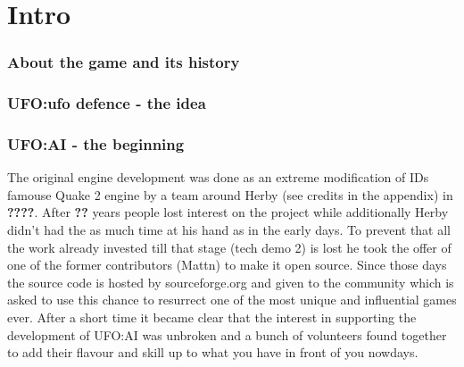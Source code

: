 
%
%


\section{Intro}

\subsubsection{About the game and its history}

\subsubsection{UFO:ufo defence - the idea}

\subsubsection{UFO:AI - the beginning}
The original engine development was done as an extreme modification of IDs famouse Quake 2 engine by a team around Herby (see credits in the appendix) in \textbf{????}. After \textbf{??} years people lost interest on the project while additionally Herby didn't had the as much time at his hand as in the early days.
To prevent that all the work already invested till that stage (tech demo 2) is lost he took the offer of one of the former contributors (Mattn) to make it open source.  Since those days the source code is hosted by sourceforge.org and given to the community which is asked to use this chance to resurrect one of the most unique and influential games ever. After a short time it became clear that the interest in supporting the development of UFO:AI was unbroken and a bunch of volunteers found together to add their flavour and skill up to what you have in front of you nowdays.

